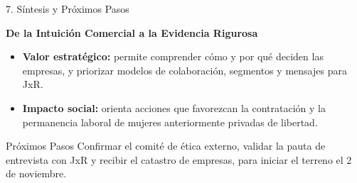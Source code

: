 \documentclass[aspectratio=169, 10pt]{beamer}
\begin{document}
\begin{frame}{7. Síntesis y Próximos Pasos}
  \begin{center}
    \Large \textbf{De la Intuición Comercial a la Evidencia Rigurosa}
  \end{center}

  \vspace{0.3cm}

  \begin{itemize}
    \item \textbf{Valor estratégico:} permite comprender cómo y por qué deciden las empresas, y priorizar modelos de colaboración, segmentos y mensajes para JxR.
    \item \textbf{Impacto social:} orienta acciones que favorezcan la contratación y la permanencia laboral de mujeres anteriormente privadas de libertad.
  \end{itemize}

  \vspace{0.3cm}

  \begin{block}{Próximos Pasos}
    Confirmar el comité de ética externo, validar la pauta de entrevista con JxR y recibir el catastro de empresas, para iniciar el terreno el 2 de noviembre.
  \end{block}
\end{frame}
\end{document}
